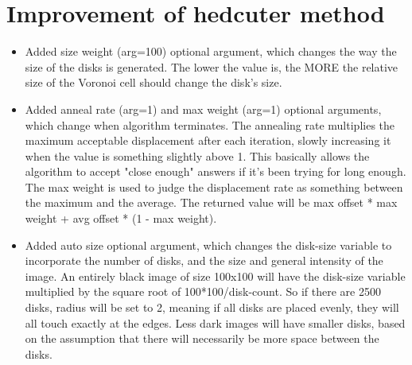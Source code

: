 \documentclass[11pt]{article}
\begin{document}
\section{Improvement of hedcuter method}

	\begin{itemize}
	\item Added size weight (arg=100) optional argument, which changes the way the size of the disks is generated. The lower the value is, the MORE the relative size of the Voronoi cell should change the disk's size.
	\item Added anneal rate (arg=1) and max weight (arg=1) optional arguments, which change when algorithm terminates. The annealing rate multiplies the maximum acceptable displacement after each iteration, slowly increasing it when the value is something slightly above 1. This basically allows the algorithm to accept "close enough" answers if it's been trying for long enough. The max weight is used to judge the displacement rate as something between the maximum and the average. The returned value will be max offset * max weight + avg offset * (1 - max weight).
	\item Added auto size optional argument, which changes the disk-size variable to incorporate the number of disks, and the size and general intensity of the image. An entirely black image of size 100x100 will have the disk-size variable multiplied by the square root of 100*100/disk-count. So if there are 2500 disks, radius will be set to 2, meaning if all disks are placed evenly, they will all touch exactly at the edges. Less dark images will have smaller disks, based on the assumption that there will necessarily be more space between the disks.
	\end{itemize}


\end{document}
